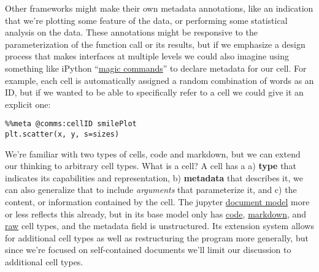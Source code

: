 \begin{Shaded}
\begin{Highlighting}[]
 \FunctionTok{\{}
  \FunctionTok{:} \FunctionTok{,}
  \FunctionTok{:} 
\FunctionTok{\}}
\end{Highlighting}
\end{Shaded}

Other frameworks might make their own metadata annotations, like an
indication that we're plotting some feature of the data, or performing
some statistical analysis on the data. These annotations might be
responsive to the parameterization of the function call or its results,
but if we emphasize a design process that makes interfaces at multiple
levels we could also imagine using something like iPython
``\href{https://ipython.readthedocs.io/en/stable/interactive/magics.html}{magic
commands}'' to declare metadata for our cell. For example, each cell is
automatically assigned a random combination of words as an ID, but if we
wanted to be able to specifically refer to a cell we could give it an
explicit one:

\begin{verbatim}
%%meta @comms:cellID smilePlot
plt.scatter(x, y, s=sizes)
\end{verbatim}

We're familiar with two types of cells, code and markdown, but we can
extend our thinking to arbitrary cell types. What is a cell? A cell has
a a) \textbf{type} that indicates its capabilities and representation,
b) \textbf{metadata} that describes it, we can also generalize that to
include \emph{arguments} that parameterize it, and c) the content, or
information contained by the cell. The jupyter
\href{https://jupyterlab.readthedocs.io/en/stable/api/classes/cells.cellmodel-1.html}{document
model} more or less reflects this already, but in its base model only
has
\href{https://jupyterlab.readthedocs.io/en/stable/api/classes/cells.codecellmodel-1.html}{code},
\href{https://jupyterlab.readthedocs.io/en/stable/api/classes/cells.markdowncellmodel.html}{markdown},
and
\href{https://jupyterlab.readthedocs.io/en/stable/api/classes/cells.rawcellmodel.html}{raw}
cell types, and the metadata field is unstructured. Its extension system
allows for additional cell types as well as restructuring the program
more generally, but since we're focused on self-contained documents
we'll limit our discussion to additional cell types.

